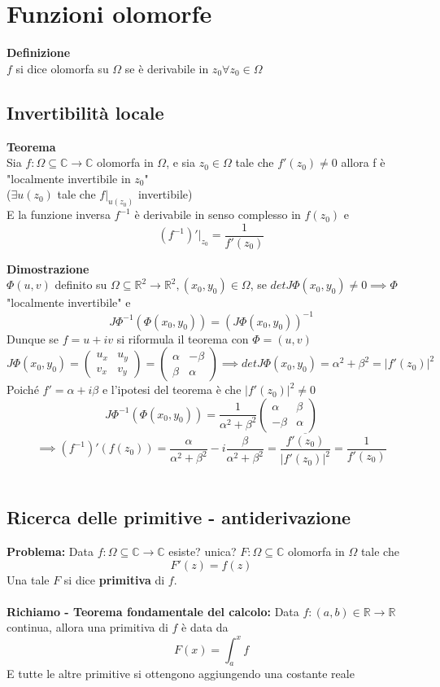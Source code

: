 \documentclass[a4paper]{article}
\newcommand{\R}{\mathbb{R}}
\newcommand{\C}{\mathbb{C}}
\begin{document}
\section{Funzioni olomorfe}
\begin{tcolorbox}
	\textbf{Definizione} \\
	$f$ si dice olomorfa su $\Omega$ se è derivabile in $z_0\forall z_0\in\Omega$
\end{tcolorbox}
\subsection{Invertibilità locale}
\begin{tcolorbox}
\textbf{Teorema}
\\Sia $f:\Omega \subseteq\C\to \C$ olomorfa in $\Omega$, e sia $z_0\in\Omega$ tale che $f'(z_0)\ne0$ allora f è "localmente invertibile in $z_0$"\\
($\exists u(z_0)$ tale che $f|_{u(z_0)}$ invertibile)
\\E la funzione inversa $f^{-1}$ è derivabile in senso complesso in $f(z_0)$ e 
\[(f^{-1})'|_{z_0}=\frac{1}{f'(z_0)}\]	
\end{tcolorbox}
\textbf{Dimostrazione}\\
$\Phi(u,v)$ definito su $\Omega \subseteq \R^2\to \R^2, (x_0,y_0)\in\Omega$, se $detJ\Phi(x_0,y_0)\ne 0\implies\Phi$ "localmente invertibile" e 
\[J\Phi^{-1}(\Phi(x_0,y_0))=(J\Phi(x_0,y_0))^{-1}\]
Dunque se $f=u+iv$ si riformula il teorema con $\Phi=(u,v)$
\[J\Phi(x_0,y_0)=\begin{pmatrix}
	u_x&u_y\\v_x & v_y
\end{pmatrix}
=\begin{pmatrix}
	\alpha & -\beta \\ \beta & \alpha
\end{pmatrix}
\implies detJ\Phi(x_0,y_0)=\alpha^2+\beta^2=|f'(z_0)|^{2}
\]
Poiché $f'=\alpha +i\beta$ e l'ipotesi del teorema è che $|f'(z_0)|^2\ne 0$
\[J\Phi^{-1}(\Phi(x_0,y_0))=\frac{1}{\alpha^2+\beta^2}\begin{pmatrix}
	\alpha&\beta\\-\beta &\alpha
\end{pmatrix}
\]
\[\implies(f^{-1})'(f(z_0))=\frac{\alpha}{\alpha^2+\beta^2}-i\frac{\beta}{\alpha^2+\beta^2}= \frac{\overline{f'(z_0)}}{|f'(z_0)|^2}=\frac{1}{f'(z_0)}\]
\\
\subsection{Ricerca delle primitive - antiderivazione}
\textbf{Problema: }Data $f:\Omega \subseteq \C\to \C$ esiste? unica? $F:\Omega\subseteq\C$ olomorfa in $\Omega$ tale che \[F'(z)=f(z)\]
Una tale $F$ si dice \textbf{primitiva} di $f$.\\
\\\textbf{Richiamo - Teorema fondamentale del calcolo: }Data $f:(a,b)\in\R\to \R$ continua, allora una primitiva di $f$ è data da \[F(x)=\int_{a}^{x} f\]
E tutte le altre primitive si ottengono aggiungendo una costante reale
\end{document}
